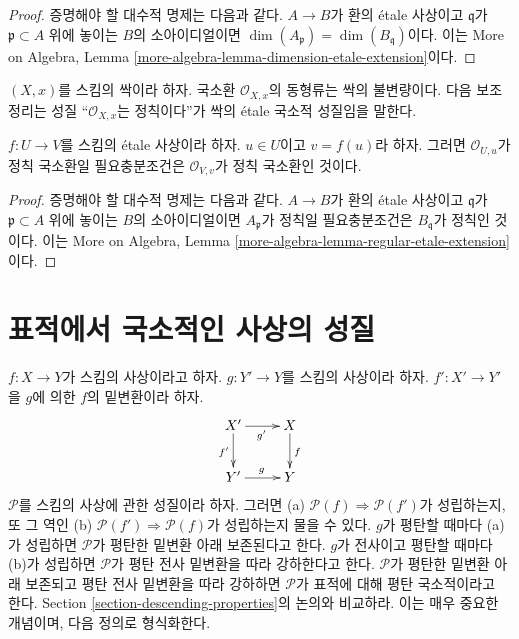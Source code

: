 \begin{proof}
증명해야 할 대수적 명제는 다음과 같다. $A \to B$가 환의 \'etale 사상이고
$\mathfrak q$가 $\mathfrak p \subset A$ 위에 놓이는 $B$의 소아이디얼이면
$\dim(A_{\mathfrak p}) = \dim(B_{\mathfrak q})$이다. 이는 More on Algebra,
Lemma \ref{more-algebra-lemma-dimension-etale-extension}이다.
\end{proof}

\noindent
$(X, x)$를 스킴의 싹이라 하자. 국소환 $\mathcal{O}_{X, x}$의 동형류는
싹의 불변량이다. 다음 보조정리는 성질 ``$\mathcal{O}_{X, x}$는 정칙이다''가
싹의 \'etale 국소적 성질임을 말한다.

\begin{lemma}
\label{lemma-regular-local-ring-local}
$f : U \to V$를 스킴의 \'etale 사상이라 하자. $u \in U$이고
$v = f(u)$라 하자. 그러면 $\mathcal{O}_{U, u}$가 정칙 국소환일 필요충분조건은
$\mathcal{O}_{V, v}$가 정칙 국소환인 것이다.
\end{lemma}

\begin{proof}
증명해야 할 대수적 명제는 다음과 같다. $A \to B$가 환의 \'etale 사상이고
$\mathfrak q$가 $\mathfrak p \subset A$ 위에 놓이는 $B$의 소아이디얼이면
$A_{\mathfrak p}$가 정칙일 필요충분조건은 $B_{\mathfrak q}$가 정칙인 것이다.
이는 More on Algebra, Lemma
\ref{more-algebra-lemma-regular-etale-extension}이다.
\end{proof}







\section{표적에서 국소적인 사상의 성질}
\label{section-descending-properties-morphisms}

\noindent
$f : X \to Y$가 스킴의 사상이라고 하자.
$g : Y' \to Y$를 스킴의 사상이라 하자.
$f' : X' \to Y'$을 $g$에 의한 $f$의 밑변환이라 하자.
$$
\xymatrix{
X' \ar[d]_{f'} \ar[r]_{g'} & X \ar[d]^f \\
Y' \ar[r]^g & Y
}
$$
$\mathcal{P}$를 스킴의 사상에 관한 성질이라 하자. 그러면
(a) $\mathcal{P}(f) \Rightarrow \mathcal{P}(f')$가 성립하는지, 또 그 역인
(b) $\mathcal{P}(f') \Rightarrow \mathcal{P}(f)$가 성립하는지 물을 수 있다.
$g$가 평탄할 때마다 (a)가 성립하면 $\mathcal{P}$가 평탄한 밑변환 아래
보존된다고 한다. $g$가 전사이고 평탄할 때마다 (b)가 성립하면
$\mathcal{P}$가 평탄 전사 밑변환을 따라 강하한다고 한다. $\mathcal{P}$가
평탄한 밑변환 아래 보존되고 평탄 전사 밑변환을 따라 강하하면
$\mathcal{P}$가 표적에 대해 평탄 국소적이라고 한다. Section
\ref{section-descending-properties}의 논의와 비교하라. 이는 매우 중요한
개념이며, 다음 정의로 형식화한다.

